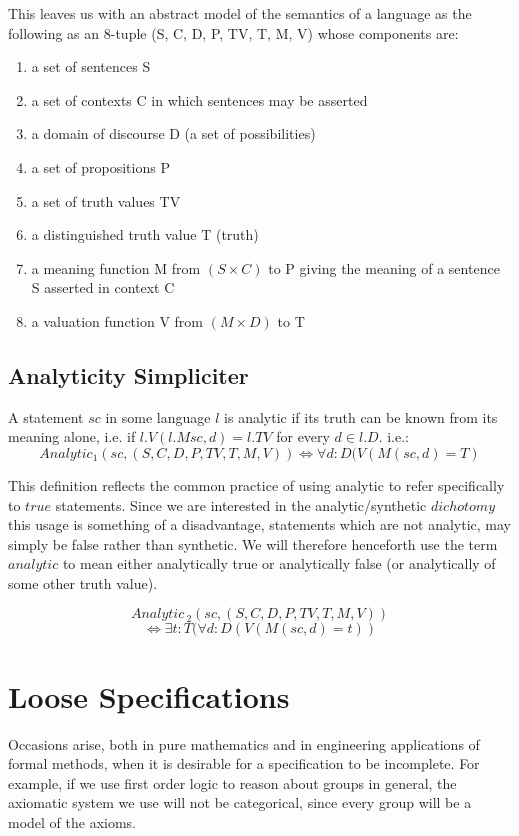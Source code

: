\documentclass{rbjk}
\begin{document}
\begin{article}
This leaves us with an abstract model of the semantics of a language as the following as an 8-tuple (S, C, D, P, TV, T, M, V) whose components are:

\begin{enumerate}
\item a set of sentences S
\item a set of contexts C in which sentences may be asserted 
\item a domain of discourse D (a set of possibilities)
\item a set of propositions P
\item a set of truth values TV
\item a distinguished truth value T (truth)
\item a meaning function M from $(S \times C)$ to P giving the meaning of a sentence S asserted in context C
\item a valuation function V from $(M \times D)$ to T
\end{enumerate}

\subsection{Analyticity Simpliciter}

A statement $sc$ in some language $l$ is analytic if its truth can be known from its meaning alone, i.e. if $l.V(l.M sc, d) = l.TV$ for every $d \in l.D$.
i.e.:
	\[ Analytic_1(sc, (S,C,D,P,TV,T,M,V)) \Leftrightarrow \forall d:D (V(M(sc, d) = T) \]

This definition reflects the common practice of using analytic to refer specifically to $true$ statements.
Since we are interested in the analytic/synthetic $dichotomy$ this usage is something of a disadvantage, statements which are not analytic, may simply be false rather than synthetic.
We will therefore henceforth use the term $analytic$ to mean either analytically true or analytically false (or analytically of some other truth value).

	\[ Analytic_{\ 2}(sc, (S,C,D,P,TV,T,M,V)) \]
	\[\Leftrightarrow \exists t:T(\forall d:D (V(M(sc, d) = t)) \]

\section{Loose Specifications}

Occasions arise, both in pure mathematics and in engineering applications of formal methods, when it is desirable for a specification to be incomplete.
For example, if we use first order logic to reason about groups in general, the axiomatic system we use will not be categorical, since every group will be a model of the axioms.


\end{article}
\end{document}

